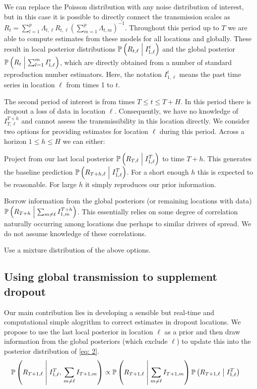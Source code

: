 \documentclass[12pt]{article}
\newcommand{\cond}{\; \m| \;}
\begin{document}
We can replace the Poisson distribution with any noise distribution of interest,
but in this case it is possible to directly connect the transmission scales as
$R_t = \sum_{l=1}^p \Lambda_{t, \ell}R_{t, \ell}\left(\sum_{m=1}^p \Lambda_{t,
m}\right)^{-1}$. Throughout this period up to $T$ we are able to compute
estimates from these models for all locations and globally. These result in
local posterior distributions $\mathbb{P}\left(R_{t, \ell} \cond I_{1,
\ell}^{t}\right)$ and the global posterior $\mathbb{P}\left(R_{t} \cond
\sum_{l=1}^m I_{1, \ell}^{t}\right)$, which are directly obtained from a number
of standard reproduction number estimators. Here, the notation $I_{1, \ell}^{t}$
means the past time series in location $\ell$ from times 1 to $t$.

The second period of interest is from times $T \leq t \leq T+H$. In this period
there is dropout \ie a loss of data in location $\ell$. Consequently, we have no
knowledge of $I_{T, \ell}^{T+h}$ and cannot assess the transmissibility in this
location directly. We consider two options for providing estimates for location
$\ell$ during this period. Across a horizon $1 \leq h \leq H$ we can either:
\benum
\item Project from our last local posterior $\mathbb{P}\left(R_{T, \ell}  \cond
I_{1, \ell}^{T}\right)$ to time $T+h$. This generates the baseline prediction
$\mathbb{P}\left(R_{T+h, \ell}  \cond I_{1, \ell}^{T}\right)$. For a short
enough $h$ this is expected to be reasonable. For large $h$ it simply reproduces
our prior information.
\item Borrow information from the global posteriors (or remaining locations with
data) $\mathbb{P}\left(R_{T+h}  \cond \sum_{m \neq \ell} I_{1, m}^{T+h}\right)$.
This essentially relies on some degree of correlation naturally occurring among
locations due perhaps to similar drivers of spread. We do not assume knowledge
of these correlations.
\item Use a mixture distribution of the above options.
\eenum

\subsection*{Using global transmission to supplement dropout}\label{sec:bayes}

Our main contribution lies in developing a sensible but real-time and
computational simple alogrithm to correct estimates in dropout locations. We
propose to use the last local posterior in location $\ell$ as a prior and then
draw information from the global posteriors (which exclude $\ell$) to update
this into the posterior distribution of \eqref{eq: 2}.
\begin{align}
& \mathbb{P}\left(R_{T+1, \ell} \cond I_{1, \ell}^T, \, \sum_{m \neq \ell} 
I_{T+1, m} \right) 
\propto \mathbb{P}\left(R_{T+1, \ell}  \cond \sum_{m \neq \ell}
 I_{T+1, m}\right)\mathbb{P}\left(R_{T+1, \ell}  \cond I_{1, \ell}^{T}\right)
 \label{eq: 2}
\end{align}
\end{document}
